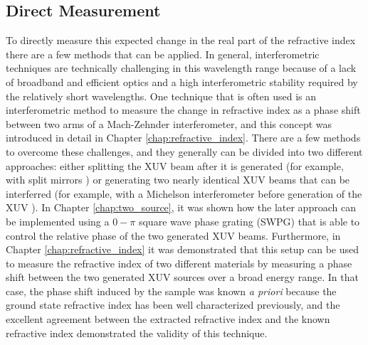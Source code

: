 \subsection{Direct Measurement}

To directly measure this expected change in the real part of the refractive index there are a few methods that can be applied.  In general, interferometric techniques are technically challenging in this wavelength range because of a lack of broadband and efficient optics and a high interferometric stability required by the relatively short wavelengths. One technique that is often used is an interferometric method to measure the change in refractive index as a phase shift between two arms of a Mach-Zehnder interferometer, and this concept was introduced in detail in Chapter \ref{chap:refractive_index}.  There are a few methods to overcome these challenges, and they generally can be divided into two different approaches: either splitting the XUV beam after it is generated (for example, with split mirrors \cite{nabekawaInterferometricAutocorrelationAttosecond2008, nabekawaInterferometryAttosecondPulse2013}) or generating two nearly identical XUV beams that can be interferred (for example, with a Michelson interferometer before generation of the XUV \cite{kovacevExtremeUltravioletFourierTransform2005}).  In Chapter \ref{chap:two_source}, it was shown how the later approach can be implemented using a  $0-\pi$ square wave phase grating (SWPG) that is able to control the relative phase of the two generated XUV beams.  Furthermore, in Chapter \ref{chap:refractive_index} it was demonstrated that this setup can be used to measure the refractive index of two different materials by measuring a phase shift between the two generated XUV sources over a broad energy range.  In that case, the phase shift induced by the sample was known \textit{a priori} because the ground state refractive index has been well characterized previously, and the excellent agreement between the extracted refractive index and the known refractive index demonstrated the validity of this technique.  

